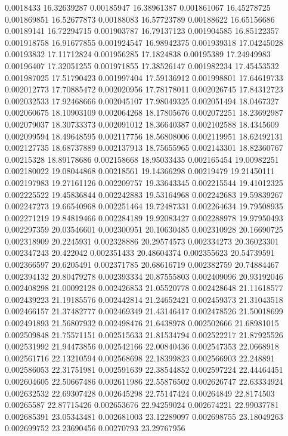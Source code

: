 0.0018433	16.32639287
0.00185947	16.38961387
0.001861067	16.45278725
0.001869851	16.52677873
0.00188083	16.57723789
0.00188622	16.65156686
0.00189141	16.72294715
0.001903787	16.79137123
0.001904585	16.85122357
0.001918758	16.91677855
0.001924547	16.98942375
0.001939318	17.04245028
0.00193832	17.11712824
0.001956285	17.1824838
0.00195389	17.24949983
0.00196407	17.32051255
0.001971855	17.38526147
0.001982234	17.45453532
0.001987025	17.51790423
0.001997404	17.59136912
0.001998801	17.64619733
0.002012773	17.70885472
0.002020956	17.78178011
0.002026745	17.84312723
0.002032533	17.92468666
0.002045107	17.98049325
0.002051494	18.0467327
0.002060675	18.10903109
0.002064268	18.17805676
0.002072251	18.23692987
0.002079037	18.30733373
0.002091012	18.36640387
0.002102588	18.4345609
0.002099594	18.49648595
0.002117756	18.56808006
0.002119951	18.62492131
0.002127735	18.68737889
0.002137913	18.75655965
0.002143301	18.82360767
0.00215328	18.89178686
0.002158668	18.95033435
0.002165454	19.00982251
0.002180022	19.08044868
0.00218561	19.14366298
0.00219479	19.21450111
0.002197983	19.27161126
0.002209757	19.33643345
0.002215544	19.41012325
0.002225522	19.45836844
0.002242883	19.53164968
0.002242683	19.59839267
0.002247273	19.66540968
0.002251464	19.72487331
0.002264634	19.79508935
0.002271219	19.84819466
0.002284189	19.92083427
0.002288978	19.97950493
0.002297359	20.03546601
0.002300951	20.10630485
0.002310928	20.16690725
0.002318909	20.2245931
0.002328886	20.29574573
0.002334273	20.36023301
0.002347243	20.422042
0.002351433	20.48604374
0.002355623	20.54739591
0.002366597	20.6205491
0.002371785	20.68616719
0.002382759	20.74884467
0.002394132	20.80479278
0.002393334	20.87555803
0.002409096	20.93192046
0.002408298	21.00092128
0.002426853	21.05520778
0.002428648	21.11618577
0.002439223	21.19185576
0.002442814	21.24652421
0.002459373	21.31043518
0.002466157	21.37482777
0.002469349	21.43146417
0.002478526	21.50018699
0.002491893	21.56807932
0.002498476	21.6438978
0.002502666	21.68981015
0.002509848	21.75571151
0.002515633	21.81534794
0.002522217	21.87925526
0.002531992	21.94473856
0.002542166	22.00840436
0.002547353	22.0668918
0.002561716	22.13210594
0.002568698	22.18399823
0.002566903	22.248891
0.002586053	22.31751981
0.002591639	22.38544852
0.002597224	22.44464451
0.002604605	22.50667486
0.002611986	22.55876502
0.002626747	22.63334924
0.002632532	22.69307428
0.002645298	22.75147424
0.00264849	22.8174503
0.00265587	22.87715426
0.002653676	22.94259024
0.002674221	22.99037781
0.002685391	23.05343481
0.002681003	23.12289097
0.002698755	23.18049263
0.002699752	23.23690456
0.00270793	23.29767956
